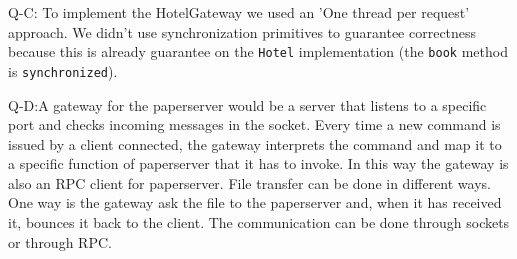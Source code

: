 Q-C: To implement the HotelGateway we used an 'One thread per request' approach. We didn't use synchronization primitives to guarantee correctness because this is already guarantee on the \texttt{Hotel} implementation (the \texttt{book} method is \texttt{synchronized}).

Q-D:A gateway for the paperserver would be a server that listens to a specific port and checks incoming messages in the socket. Every time a new command is issued by a client connected, the gateway interprets the command and map it to a specific function of paperserver that it has to invoke. In this way the gateway is also an RPC client for paperserver. File transfer can be done in different ways. One way is the gateway ask the file to the paperserver and, when it has received it, bounces it back to the client. The communication can be done through sockets or through RPC.


